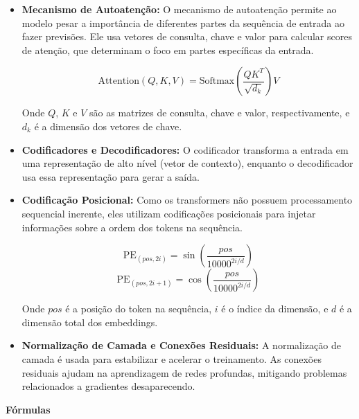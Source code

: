 \begin{itemize}
    \item \textbf{Mecanismo de Autoatenção:}  
    O mecanismo de autoatenção permite ao modelo pesar a importância de diferentes partes da sequência de entrada ao fazer previsões. Ele usa vetores de consulta, chave e valor para calcular scores de atenção, que determinam o foco em partes específicas da entrada.

    \begin{equation}
    \text{Attention}(Q, K, V) = \text{Softmax}\left(\frac{QK^T}{\sqrt{d_k}}\right)V
    \end{equation}

    Onde \(Q\), \(K\) e \(V\) são as matrizes de consulta, chave e valor, respectivamente, e \(d_k\) é a dimensão dos vetores de chave.

    \item \textbf{Codificadores e Decodificadores:}  
    O codificador transforma a entrada em uma representação de alto nível (vetor de contexto), enquanto o decodificador usa essa representação para gerar a saída.

    \item \textbf{Codificação Posicional:}  
    Como os transformers não possuem processamento sequencial inerente, eles utilizam codificações posicionais para injetar informações sobre a ordem dos tokens na sequência.

    \begin{equation}
    \text{PE}_{(pos, 2i)} = \sin\left(\frac{pos}{10000^{2i/d}}\right)
    \end{equation}
    \begin{equation}
    \text{PE}_{(pos, 2i+1)} = \cos\left(\frac{pos}{10000^{2i/d}}\right)
    \end{equation}

    Onde \(pos\) é a posição do token na sequência, \(i\) é o índice da dimensão, e \(d\) é a dimensão total dos embeddings.

    \item \textbf{Normalização de Camada e Conexões Residuais:}  
    A normalização de camada é usada para estabilizar e acelerar o treinamento. As conexões residuais ajudam na aprendizagem de redes profundas, mitigando problemas relacionados a gradientes desaparecendo.
\end{itemize}

\textbf{Fórmulas}

